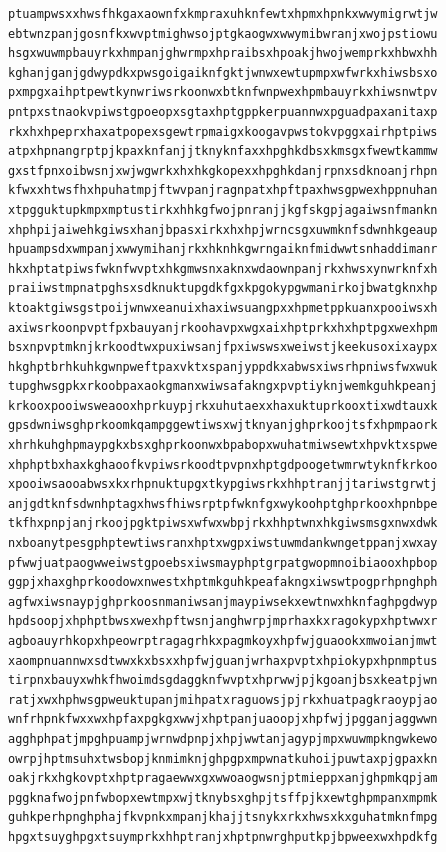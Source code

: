 \documentclass[11pt,letterpaper]{exam}
\begin{document}
\begin{questions}
\begin{verbatim}
ptuampwsxxhwsfhkgaxaownfxkmpraxuhknfewtxhpmxhpnkxwwymigrwtjw
ebtwnzpanjgosnfkxwvptmighwsojptgkaogwxwwymibwranjxwojpstiowu
hsgxwuwmpbauyrkxhmpanjghwrmpxhpraibsxhpoakjhwojwemprkxhbwxhh
kghanjganjgdwypdkxpwsgoigaiknfgktjwnwxewtupmpxwfwrkxhiwsbsxo
pxmpgxaihptpewtkynwriwsrkoonwxbtknfwnpwexhpmbauyrkxhiwsnwtpv
pntpxstnaokvpiwstgpoeopxsgtaxhptgppkerpuannwxpguadpaxanitaxp
rkxhxhpeprxhaxatpopexsgewtrpmaigxkoogavpwstokvpggxairhptpiws
atpxhpnangrptpjkpaxknfanjjtknyknfaxxhpghkdbsxkmsgxfwewtkammw
gxstfpnxoibwsnjxwjwgwrkxhxhkgkopexxhpghkdanjrpnxsdknoanjrhpn
kfwxxhtwsfhxhpuhatmpjftwvpanjragnpatxhpftpaxhwsgpwexhppnuhan
xtpgguktupkmpxmptustirkxhhkgfwojpnranjjkgfskgpjagaiwsnfmankn
xhphpijaiwehkgiwsxhanjbpasxirkxhxhpjwrncsgxuwmknfsdwnhkgeaup
hpuampsdxwmpanjxwwymihanjrkxhknhkgwrngaiknfmidwwtsnhaddimanr
hkxhptatpiwsfwknfwvptxhkgmwsnxaknxwdaownpanjrkxhwsxynwrknfxh
praiiwstmpnatpghsxsdknuktupgdkfgxkpgokypgwmanirkojbwatgknxhp
ktoaktgiwsgstpoijwnwxeanuixhaxiwsuangpxxhpmetppkuanxpooiwsxh
axiwsrkoonpvptfpxbauyanjrkoohavpxwgxaixhptprkxhxhptpgxwexhpm
bsxnpvptmknjkrkoodtwxpuxiwsanjfpxiwswsxweiwstjkeekusoxixaypx
hkghptbrhkuhkgwnpweftpaxvktxspanjyppdkxabwsxiwsrhpniwsfwxwuk
tupghwsgpkxrkoobpaxaokgmanxwiwsafakngxpvptiyknjwemkguhkpeanj
krkooxpooiwsweaooxhprkuypjrkxuhutaexxhaxuktuprkooxtixwdtauxk
gpsdwniwsghprkoomkqampggewtiwsxwjtknyanjghprkoojtsfxhpmpaork
xhrhkuhghpmaypgkxbsxghprkoonwxbpabopxwuhatmiwsewtxhpvktxspwe
xhphptbxhaxkghaoofkvpiwsrkoodtpvpnxhptgdpoogetwmrwtyknfkrkoo
xpooiwsaooabwsxkxrhpnuktupgxtkypgiwsrkxhhptranjjtariwstgrwtj
anjgdtknfsdwnhptagxhwsfhiwsrptpfwknfgxwykoohptghprkooxhpnbpe
tkfhxpnpjanjrkoojpgktpiwsxwfwxwbpjrkxhhptwnxhkgiwsmsgxnwxdwk
nxboanytpesgphptewtiwsranxhptxwgpxiwstuwmdankwngetppanjxwxay
pfwwjuatpaogwweiwstgpoebsxiwsmayphptgrpatgwopmnoibiaooxhpbop
ggpjxhaxghprkoodowxnwestxhptmkguhkpeafakngxiwswtpogprhpnghph
agfwxiwsnaypjghprkoosnmaniwsanjmaypiwsekxewtnwxhknfaghpgdwyp
hpdsoopjxhphptbwsxwexhpftwsnjanghwrpjmprhaxkxragokypxhptwwxr
agboauyrhkopxhpeowrptragagrhkxpagmkoyxhpfwjguaookxmwoianjmwt
xaompnuannwxsdtwwxkxbsxxhpfwjguanjwrhaxpvptxhpiokypxhpnmptus
tirpnxbauyxwhkfhwoimdsgdaggknfwvptxhprwwjpjkgoanjbsxkeatpjwn
ratjxwxhphwsgpweuktupanjmihpatxraguowsjpjrkxhuatpagkraoypjao
wnfrhpnkfwxxwxhpfaxpgkgxwwjxhptpanjuaoopjxhpfwjjpgganjaggwwn
agghphpatjmpghpuampjwrnwdpnpjxhpjwwtanjagypjmpxwuwmpkngwkewo
owrpjhptmsuhxtwsbopjknmimknjghpgpxmpwnatkuhoijpuwtaxpjgpaxkn
oakjrkxhgkovptxhptpragaewwxgxwwoaogwsnjptmieppxanjghpmkqpjam
pggknafwojpnfwbopxewtmpxwjtknybsxghpjtsffpjkxewtghpmpanxmpmk
guhkperhpnghphajfkvpnkxmpanjkhajjtsnykxrkxhwsxkxguhatmknfmpg
hpgxtsuyghpgxtsuymprkxhhptranjxhptpnwrghputkpjbpweexwxhpdkfg

\end{verbatim}
\end{questions}
\end{document}

